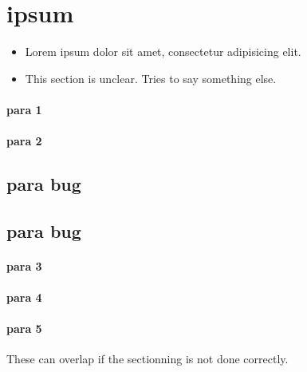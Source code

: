 \section{ipsum}
\label{autosec:4}
    \begin{itemize}[noitemsep]
        \item Lorem ipsum dolor sit amet, consectetur adipisicing elit.
        \item {\color{OliveGreen}This section is unclear.}
{\color{OliveGreen}Tries to say something else.}
    \end{itemize}
\paragraph{para 1}
\label{autosec:5}
\paragraph{para 2}
\label{autosec:5}
\subsection{para bug}
\label{autosec:5}
\vspace{-36pt}\hspace{11pt}
\subsection{para bug}
\label{autosec:6}
\vspace{-36pt}\hspace{11pt}
\paragraph{para 3}
\label{autosec:7}
\paragraph{para 4}
\label{autosec:7}
\paragraph{para 5}
\label{autosec:7}
These can overlap if the sectionning is not done correctly.
